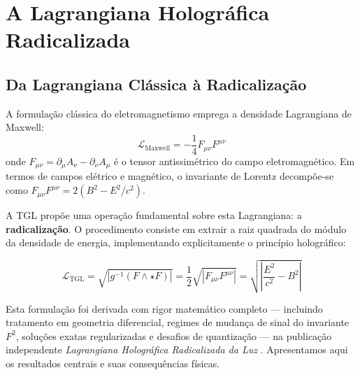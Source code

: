 \documentclass[12pt,a4paper,twoside]{article}
\newcommand{\Ltgl}{\mathcal{L}_{\text{TGL}}}
\begin{document}

\section{A Lagrangiana Hologr\'afica Radicalizada}


\subsection{Da Lagrangiana Cl\'assica \`a Radicaliza\c{c}\~ao}

A formula\c{c}\~ao cl\'assica do eletromagnetismo emprega a densidade Lagrangiana de Maxwell:
\begin{equation}
\mathcal{L}_{\text{Maxwell}} = -\frac{1}{4}F_{\mu\nu}F^{\mu\nu}
\label{eq:maxwell_lagrangian}
\end{equation}
onde $F_{\mu\nu} = \partial_\mu A_\nu - \partial_\nu A_\mu$ \'e o tensor antissim\'etrico do campo eletromagn\'etico. Em termos de campos el\'etrico e magn\'etico, o invariante de Lorentz decomp\~oe-se como $F_{\mu\nu}F^{\mu\nu} = 2(B^2 - E^2/c^2)$.

A TGL prop\~oe uma opera\c{c}\~ao fundamental sobre esta Lagrangiana: a \textbf{radicaliza\c{c}\~ao}. O procedimento consiste em extrair a raiz quadrada do m\'odulo da densidade de energia, implementando explicitamente o princ\'ipio hologr\'afico:

\begin{equationbox}[title={Lagrangiana Hologr\'afica Radicalizada / Radicalized Holographic Lagrangian}]
\begin{equation}
\boxed{\Ltgl = \sqrt{\left|g^{-1}(F \wedge \star F)\right|} = \frac{1}{2}\sqrt{\left|F_{\mu\nu}F^{\mu\nu}\right|} = \sqrt{\left|\frac{E^2}{c^2} - B^2\right|}}
\label{eq:ltgl_radicalized}
\end{equation}
\end{equationbox}

\noindent Esta formula\c{c}\~ao foi derivada com rigor matem\'atico completo --- incluindo tratamento em geometria diferencial, regimes de mudan\c{c}a de sinal do invariante $F^2$, solu\c{c}\~oes exatas regularizadas e desafios de quantiza\c{c}\~ao --- na publica\c{c}\~ao independente \textit{Lagrangiana Hologr\'afica Radicalizada da Luz} \cite{Miguel2025Zenodo}. Apresentamos aqui os resultados centrais e suas consequ\^encias f\'isicas.
\end{document}
